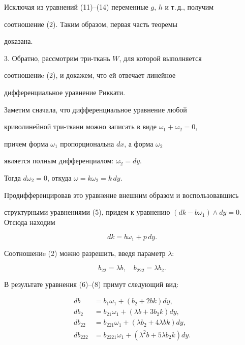 Исключая из уравнений (11)--(14) переменные $g$, $h$ и т.\,д., получим 


соотношение (2). Таким образом, первая часть теоремы 


доказана. 


\medskip 


 


3. Обратно, рассмотрим три-ткань $W$, для которой выполняется 


соотношениe (2), и докажем, что ей отвечает линейное 


дифференциальное уравнение Риккати. 


 


Заметим сначала, что дифференциальное уравнение любой 


криволинейной три-ткани можно записать в виде $\omega_1+\omega_2=0$, 


причем форма $\omega_1$ пропорциональна $dx$, а форма $\omega_2$ 


является полным дифференциалом: $\omega_2=dy$. 


Тогда $d\omega_2=0$, откуда $\omega=k\omega_2=k\,dy$. 


Продифференцировав это уравнение внешним образом и воспользовавшись 


структурными уравнениями (5), придем к уравнению $(dk-b\omega_1)\wedge 


dy=0$. Отсюда находим 


\begin{equation} 


dk=b\omega_1+p\,dy. 


\end{equation} 


Соотношениe (2) можно разрешить, введя параметр $\lambda$: 


\begin{equation} 


b_{22}=\lambda b,\quad b_{222}=\lambda b_2. 


\end{equation} 


В результате уравнения (6)--(8) примут следующий вид: 


\begin{equation} 


\begin{split} 


db&=b_1\omega_1+(b_2+2bk)dy,\\ 


db_2&=b_{21}\omega_1+(\lambda b+3b_2k)dy,\\ 


db_{22}&=b_{221}\omega_1+(\lambda b_2+4\lambda bk)dy,\\ 


db_{222}&=b_{2221}\omega_1+(\lambda^2b+5\lambda b_2k)dy. 


\end{split} 


\end{equation} 


